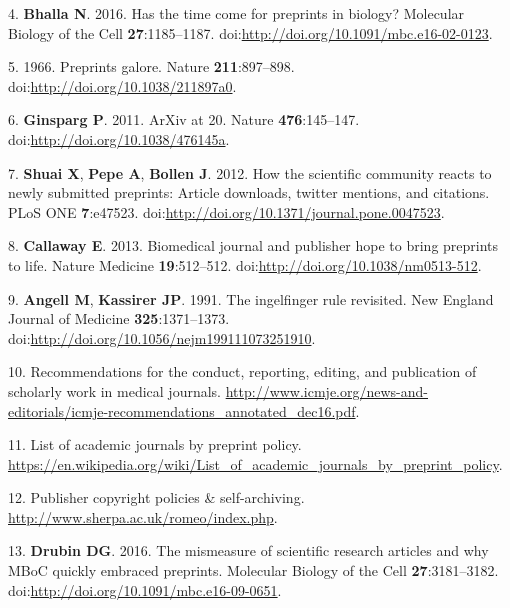 \documentclass[11pt,]{article}
\begin{document}
4. \textbf{Bhalla N}. 2016. Has the time come for preprints in biology?
Molecular Biology of the Cell \textbf{27}:1185--1187.
doi:\url{http://doi.org/10.1091/mbc.e16-02-0123}.

5. 1966. Preprints galore. Nature \textbf{211}:897--898.
doi:\url{http://doi.org/10.1038/211897a0}.

6. \textbf{Ginsparg P}. 2011. ArXiv at 20. Nature \textbf{476}:145--147.
doi:\url{http://doi.org/10.1038/476145a}.

7. \textbf{Shuai X}, \textbf{Pepe A}, \textbf{Bollen J}. 2012. How the
scientific community reacts to newly submitted preprints: Article
downloads, twitter mentions, and citations. PLoS ONE \textbf{7}:e47523.
doi:\url{http://doi.org/10.1371/journal.pone.0047523}.

8. \textbf{Callaway E}. 2013. Biomedical journal and publisher hope to
bring preprints to life. Nature Medicine \textbf{19}:512--512.
doi:\url{http://doi.org/10.1038/nm0513-512}.

9. \textbf{Angell M}, \textbf{Kassirer JP}. 1991. The ingelfinger rule
revisited. New England Journal of Medicine \textbf{325}:1371--1373.
doi:\url{http://doi.org/10.1056/nejm199111073251910}.

10. Recommendations for the conduct, reporting, editing, and publication
of scholarly work in medical journals.
\url{http://www.icmje.org/news-and-editorials/icmje-recommendations_annotated_dec16.pdf}.

11. List of academic journals by preprint policy.
\url{https://en.wikipedia.org/wiki/List_of_academic_journals_by_preprint_policy}.

12. Publisher copyright policies \& self-archiving.
\url{http://www.sherpa.ac.uk/romeo/index.php}.

13. \textbf{Drubin DG}. 2016. The mismeasure of scientific research
articles and why MBoC quickly embraced preprints. Molecular Biology of
the Cell \textbf{27}:3181--3182.
doi:\url{http://doi.org/10.1091/mbc.e16-09-0651}.
\end{document}
